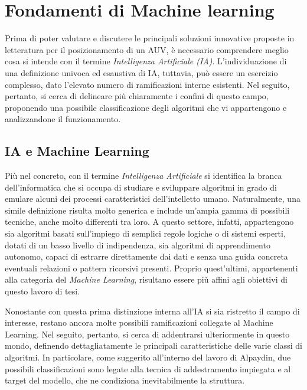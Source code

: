 
\chapter{Fondamenti di Machine learning}

Prima di poter valutare e discutere le principali soluzioni innovative proposte in letteratura per il posizionamento di un AUV, è necessario comprendere meglio cosa si intende con il termine \emph{Intelligenza Artificiale (IA)}. L'individuazione di una definizione univoca ed esaustiva di IA, tuttavia, può essere un esercizio complesso, dato l'elevato numero di ramificazioni interne esistenti. Nel seguito, pertanto, si cerca di delineare più chiaramente i confini di questo campo, proponendo una possibile classificazione degli algoritmi che vi appartengono e analizzandone il funzionamento.   

\section{IA e Machine Learning}

Più nel concreto, con il termine \textit{Intelligenza Artificiale} si identifica la branca dell'informatica che si occupa di studiare e sviluppare algoritmi in grado di emulare alcuni dei processi caratteristici dell'intelletto umano. Naturalmente, una simile definizione risulta molto generica e include un'ampia gamma di possibili tecniche, anche molto differenti tra loro. A questo settore, infatti, appartengono sia algoritmi basati sull'impiego di semplici regole logiche o di sistemi esperti, dotati di un basso livello di indipendenza, sia algoritmi di apprendimento autonomo, capaci di estrarre direttamente dai dati e senza una guida concreta eventuali relazioni o pattern ricorsivi presenti. Proprio quest'ultimi, appartenenti alla categoria del \textit{Machine Learning}, risultano essere più affini agli obiettivi di questo lavoro di tesi. 

Nonostante con questa prima distinzione interna all'IA si sia ristretto il campo di interesse, restano ancora molte possibili ramificazioni collegate al Machine Learning. Nel seguito, pertanto, si cerca di addentrarsi ulteriormente in questo mondo, definendo dettagliatamente le principali caratteristiche delle varie classi di algoritmi. In particolare, come suggerito all'interno del lavoro di Alpaydin\cite{ML_Introduction}, due possibili classificazioni sono legate alla tecnica di addestramento impiegata e al target del modello, che ne condiziona inevitabilmente la struttura. 

